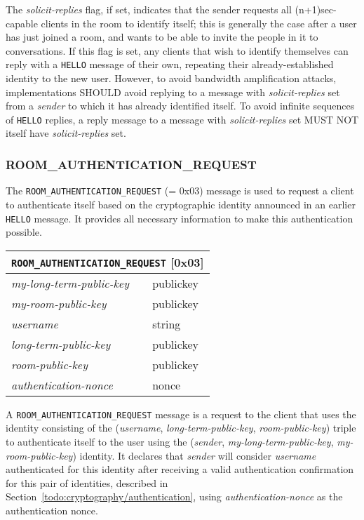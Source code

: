 \documentclass{article}
\def\message#1{\texttt{#1}}
\def\field#1{\textit{#1}}
\newenvironment{basicmessage}[2]{
\newcommand{\messagefield}[2]{
\field{##1} & \textsf{##2} \\
\hline
}
\begin{tabular}{|l|l|}
\hline
\multicolumn{2}{|c|}{\message{#1} [#2]} \\
\hline
\hline
}{
\end{tabular}
}
\begin{document}
The \field{solicit-replies} flag, if set, indicates that the sender requests all (n+1)sec-capable clients in the room to identify itself; this is generally the case after a user has just joined a room, and wants to be able to invite the people in it to conversations.
If this flag is set, any clients that wish to identify themselves can reply with a \message{HELLO} message of their own, repeating their already-established identity to the new user.
However, to avoid bandwidth amplification attacks, implementations SHOULD avoid replying to a message with \field{solicit-replies} set from a \field{sender} to which it has already identified itself.
To avoid infinite sequences of \message{HELLO} replies, a reply message to a message with \field{solicit-replies} set MUST NOT itself have \field{solicit-replies} set.


\subsubsection{ROOM\_AUTHENTICATION\_REQUEST}
\label{sec:messages/room-authentication-request}

The \message{ROOM\_AUTHENTICATION\_REQUEST} (= 0x03) message is used to request a client to authenticate itself based on the cryptographic identity announced in an earlier \message{HELLO} message.
It provides all necessary information to make this authentication possible.

\begin{basicmessage}{ROOM\_AUTHENTICATION\_REQUEST}{0x03}
\messagefield{my-long-term-public-key}{publickey}
\messagefield{my-room-public-key}{publickey}
\messagefield{username}{string}
\messagefield{long-term-public-key}{publickey}
\messagefield{room-public-key}{publickey}
\messagefield{authentication-nonce}{nonce}
\end{basicmessage}

A \message{ROOM\_AUTHENTICATION\_REQUEST} message is a request to the client that uses the identity consisting of the (\field{username}, \field{long-term-public-key}, \field{room-public-key}) triple to authenticate itself to the user using the (\field{sender}, \field{my-long-term-public-key}, \field{my-room-public-key}) identity.
It declares that \field{sender} will consider \field{username} authenticated for this identity after receiving a valid authentication confirmation for this pair of identities, described in Section~\ref{todo:cryptography/authentication}, using \field{authentication-nonce} as the authentication nonce.
\end{document}
